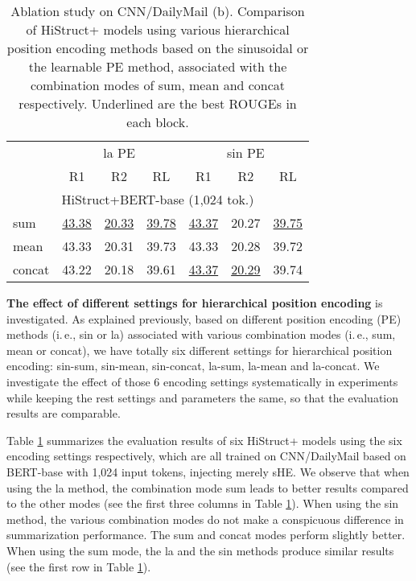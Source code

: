 \documentclass[11pt]{article}
\begin{document}
\begin{table}[ht]
\fontsize{9}{9}
\selectfont
\centering
\begin{tabular}{@{}lllllll@{}}
\toprule
\multirow{2}{*}{} &
  \multicolumn{3}{c}{la PE} &
  \multicolumn{3}{c}{sin PE} \\ \cmidrule(l){2-7} &
  \multicolumn{1}{c}{R1} &
  \multicolumn{1}{c}{R2} &
  \multicolumn{1}{c}{RL} &
  \multicolumn{1}{c}{R1} &
  \multicolumn{1}{c}{R2} &
  \multicolumn{1}{c}{RL} \\ \midrule
\multicolumn{7}{c}{HiStruct+BERT-base (1,024 tok.)}   \\ \midrule
sum    & \underline{43.38} & \underline{20.33} & \underline{39.78} & \underline{43.37} & 20.27 & \underline{39.75} \\
mean   & 43.33 & 20.31 & 39.73 & 43.33 & 20.28 & 39.72 \\
concat & 43.22 & 20.18 & 39.61 & \underline{43.37} & \underline{20.29} & 39.74 \\ \bottomrule
\end{tabular}
\caption[Ablation study on CNN/DailyMail (b)]{Ablation study on CNN/DailyMail (b). Comparison of HiStruct+ models using various hierarchical position encoding methods based on the sinusoidal or the learnable PE method, associated with the combination modes of sum, mean and concat respectively. Underlined are the best ROUGEs in each block.} \label{tab:cnndm_ablation_b}
\end{table}


\textbf{The effect of different settings for hierarchical position encoding} is investigated. As explained previously, based on different position encoding (PE) methods  (i.\,e., sin or la) associated with various combination modes (i.\,e., sum, mean or concat), we have totally six different settings for hierarchical position encoding: sin-sum, sin-mean, sin-concat, la-sum, la-mean and la-concat.  We investigate the effect of those 6 encoding settings systematically in experiments while keeping the rest settings and parameters the same, so that the evaluation results are comparable.


Table \ref{tab:cnndm_ablation_b} summarizes the evaluation results of six HiStruct+ models using the six encoding settings respectively, which are all trained on CNN/DailyMail based on BERT-base with 1,024 input tokens, injecting merely sHE. We observe that when using the la method, the combination mode sum leads to better results compared to the other modes (see the first three columns in Table \ref{tab:cnndm_ablation_b}). When using the sin method,  the various combination modes do not make a conspicuous difference in summarization performance. The sum and concat modes perform slightly better. When using the sum mode, the la and the sin methods produce similar results (see the first row in Table \ref{tab:cnndm_ablation_b}). 
\end{document}
